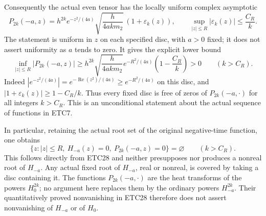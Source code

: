 Consequently the actual even tensor has the locally uniform
complex asymptotic
\begin{equation}\tag{ETC27}
 P_{2k}(-a,z)=h^{2k}e^{-z^2/(4a)}
             \sqrt{\frac{h}{4akm_2}}\,(1+\varepsilon_{k}(z)),
 \qquad \sup_{|z|\le R}|\varepsilon_k(z)|\le\frac{C_R}{k}.
\end{equation}
The statement is uniform in $z$ on each specified disc,
with $a>0$ fixed; it does not assert uniformity as $a$
tends to zero. It gives the explicit lower bound
\begin{equation}\tag{ETC28}
 \inf_{|z|\le R}|P_{2k}(-a,z)|
 \ge h^{2k}\sqrt{\frac{h}{4akm_2}}
              e^{-R^2/(4a)}\left(1-\frac{C_R}{k}\right)>0
                        \qquad(k>C_R).
\end{equation}
Indeed $|e^{-z^2/(4a)}|=e^{-\operatorname{Re}(z^2)/(4a)}
\ge e^{-R^2/(4a)}$ on this disc, and
$|1+\varepsilon_k(z)|\ge1-C_R/k$. Thus every fixed
disc is free of zeros of $P_{2k}(-a,\cdot)$ for all integers
$k>C_R$. This is an unconditional statement about the
actual sequence of functions in ETC7.

In particular, retaining the actual root set of the original
negative-time function, one obtains
\begin{equation}\tag{ETC29}
 \{z:|z|\le R,\ H_{-a}(z)=0,\ P_{2k}(-a,z)=0\}
                      =\varnothing\qquad(k>C_R).
\end{equation}
This follows directly from ETC28 and neither presupposes
nor produces a nonreal root of $H_{-a}$. Any actual fixed
root of $H_{-a}$, real or nonreal, is covered by taking a
disc containing it. The functions $P_{2k}(-a,\cdot)$ are
the heat transforms of the powers $H_0^{2k}$; no argument
here replaces them by the ordinary powers $H_{-a}^{2k}$.
Their quantitatively proved nonvanishing in ETC28 therefore
does not assert nonvanishing of $H_{-a}$ or of $H_0$.
